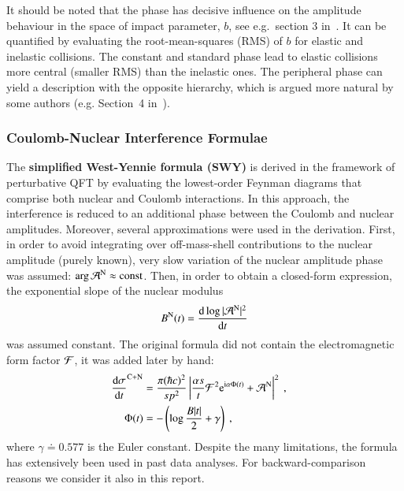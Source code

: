 It should be noted that the phase has decisive influence on the amplitude behaviour in the space of impact parameter, $b$, see e.g.~section 3 in~\cite{klk02}. It can be quantified by evaluating the root-mean-squares (RMS) of $b$ for elastic and inelastic collisions. The constant and standard phase lead to elastic collisions more central (smaller RMS) than the inelastic ones. The peripheral phase can yield a description with the opposite hierarchy, which is argued more natural by some authors (e.g. Section~4 in~\cite{kl96}).

\subsubsection{Coulomb-Nuclear Interference Formulae}

The {\bf simplified West-Yennie formula (SWY)} \cite{wy68} is derived in the framework of perturbative QFT by evaluating the lowest-order Feynman diagrams that comprise both nuclear and Coulomb interactions. In this approach, the interference is reduced to an additional phase between the Coulomb and nuclear amplitudes. Moreover, several approximations were used in the derivation. First, in order to avoid integrating over off-mass-shell contributions to the nuclear amplitude (purely known), very slow variation of the nuclear amplitude phase was assumed: $\arg {\cal A}^{\rm N} \approx \hbox{const}$. Then, in order to obtain a closed-form expression, the exponential slope of the nuclear modulus
\begin{equation}
B^{\rm N}(t) = {\d \log |{\cal A}^{\rm N}|^2 \over \d t}
\end{equation}
was assumed constant. The original formula did not contain the electromagnetic form factor ${\cal F}$, it was added later by hand:
\begin{equation}
\label{eq:int swy}
	\begin{aligned}
		{\d\sigma\over \d t}^{\rm C+N} &= {\pi (\hbar c)^2 \over s p^2} \left | {\alpha s\over t} {\cal F}^2 \e^{\I\alpha \Phi(t)} + {\cal A}^{\rm N} \right |^2\ ,\cr
		\Phi(t) &= - \left( \log {B |t|\over 2} + \gamma \right)\ ,\cr
	\end{aligned}
\end{equation}
where $\gamma \doteq 0.577$ is the Euler constant. Despite the many limitations, the formula has extensively been used in past data analyses. For backward-comparison reasons we consider it also in this report.

